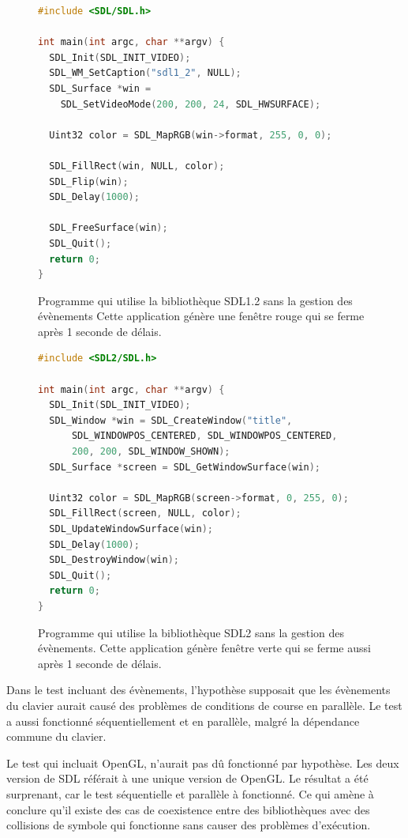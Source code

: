 \begin{center}
  \begin{figure}[ht]
\begin{lstlisting}[language=C,frame=single]
#include <SDL/SDL.h>

int main(int argc, char **argv) {
  SDL_Init(SDL_INIT_VIDEO);
  SDL_WM_SetCaption("sdl1_2", NULL);
  SDL_Surface *win =
    SDL_SetVideoMode(200, 200, 24, SDL_HWSURFACE);

  Uint32 color = SDL_MapRGB(win->format, 255, 0, 0);

  SDL_FillRect(win, NULL, color);
  SDL_Flip(win);
  SDL_Delay(1000);

  SDL_FreeSurface(win);
  SDL_Quit();
  return 0;
}
\end{lstlisting}
    \caption{Programme qui utilise la bibliothèque SDL1.2 sans la gestion des évènements
    Cette application génère une fenêtre rouge qui se ferme après 1 seconde de délais.}
  \end{figure}
\end{center}

\begin{center}
  \begin{figure}[ht]
\begin{lstlisting}[language=C,frame=single]
#include <SDL2/SDL.h>

int main(int argc, char **argv) {
  SDL_Init(SDL_INIT_VIDEO);
  SDL_Window *win = SDL_CreateWindow("title",
      SDL_WINDOWPOS_CENTERED, SDL_WINDOWPOS_CENTERED,
      200, 200, SDL_WINDOW_SHOWN);
  SDL_Surface *screen = SDL_GetWindowSurface(win);

  Uint32 color = SDL_MapRGB(screen->format, 0, 255, 0);
  SDL_FillRect(screen, NULL, color);
  SDL_UpdateWindowSurface(win);
  SDL_Delay(1000);
  SDL_DestroyWindow(win);
  SDL_Quit();
  return 0;
}
\end{lstlisting}
    \caption{Programme qui utilise la bibliothèque SDL2 sans la gestion des évènements.
    Cette application génère fenêtre verte qui se ferme aussi après 1 seconde de délais.}
  \end{figure}
\end{center}

Dans le test incluant des évènements, l'hypothèse supposait que les évènements du clavier
aurait causé des problèmes de conditions de course en parallèle. Le test a aussi fonctionné
séquentiellement et en parallèle, malgré la dépendance commune du clavier.

Le test qui incluait OpenGL, n'aurait pas dû fonctionné par hypothèse. Les deux version
de SDL référait à une unique version de OpenGL. Le résultat a été surprenant, car le test
séquentielle et parallèle à fonctionné. Ce qui amène à conclure qu'il existe des cas
de coexistence entre des bibliothèques avec des collisions de symbole qui fonctionne
sans causer des problèmes d'exécution.



